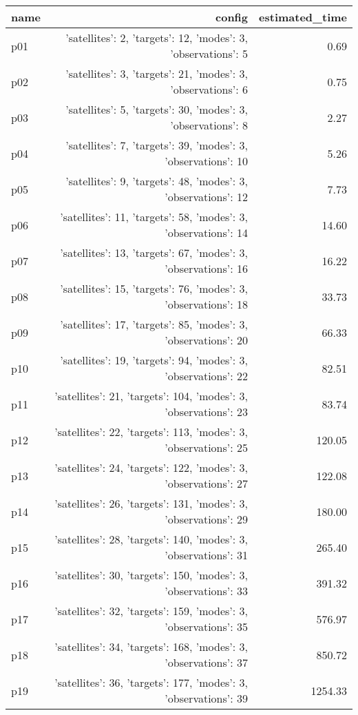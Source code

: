 \documentclass{article}
\begin{document}
                            \begin{center}
                            \scriptsize
                            \begin{tabular}{@{}l|r|r@{}}
                            name & config & estimated\_time\\\midrule
                              p01&{'satellites': 2, 'targets': 12, 'modes': 3, 'observations': 5}&0.69\\
  p02&{'satellites': 3, 'targets': 21, 'modes': 3, 'observations': 6}&0.75\\
  p03&{'satellites': 5, 'targets': 30, 'modes': 3, 'observations': 8}&2.27\\
  p04&{'satellites': 7, 'targets': 39, 'modes': 3, 'observations': 10}&5.26\\
  p05&{'satellites': 9, 'targets': 48, 'modes': 3, 'observations': 12}&7.73\\
  p06&{'satellites': 11, 'targets': 58, 'modes': 3, 'observations': 14}&14.60\\
  p07&{'satellites': 13, 'targets': 67, 'modes': 3, 'observations': 16}&16.22\\
  p08&{'satellites': 15, 'targets': 76, 'modes': 3, 'observations': 18}&33.73\\
  p09&{'satellites': 17, 'targets': 85, 'modes': 3, 'observations': 20}&66.33\\
  p10&{'satellites': 19, 'targets': 94, 'modes': 3, 'observations': 22}&82.51\\
  p11&{'satellites': 21, 'targets': 104, 'modes': 3, 'observations': 23}&83.74\\
  p12&{'satellites': 22, 'targets': 113, 'modes': 3, 'observations': 25}&120.05\\
  p13&{'satellites': 24, 'targets': 122, 'modes': 3, 'observations': 27}&122.08\\
  p14&{'satellites': 26, 'targets': 131, 'modes': 3, 'observations': 29}&180.00\\
  p15&{'satellites': 28, 'targets': 140, 'modes': 3, 'observations': 31}&265.40\\
  p16&{'satellites': 30, 'targets': 150, 'modes': 3, 'observations': 33}&391.32\\
  p17&{'satellites': 32, 'targets': 159, 'modes': 3, 'observations': 35}&576.97\\
  p18&{'satellites': 34, 'targets': 168, 'modes': 3, 'observations': 37}&850.72\\
  p19&{'satellites': 36, 'targets': 177, 'modes': 3, 'observations': 39}&1254.33\\

\end{tabular}
\end{center}
\end{document}
